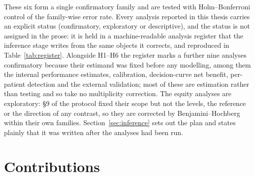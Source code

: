 These six form a single confirmatory family and are tested with
Holm--Bonferroni control of the family-wise error rate. Every analysis reported
in this thesis carries an explicit status (confirmatory, exploratory or
descriptive), and the status is not assigned in the prose: it is held in a
machine-readable analysis register that the inference stage writes from the
same objects it corrects, and reproduced in Table~\ref{tab:register}. Alongside
H1--H6 the register marks a further nine analyses confirmatory because their
estimand was fixed before any modelling, among them the internal performance
estimates, calibration, decision-curve net benefit, per-patient detection and
the external validation; most of these are estimation rather than testing and
so take no multiplicity correction. The equity analyses are exploratory: §9 of
the protocol fixed their scope but not the levels, the reference or the
direction of any contrast, so they are corrected by Benjamini--Hochberg within
their own families. Section~\ref{sec:inference} sets out the plan and states
plainly that it was written after the analyses had been run.


\section{Contributions}
\label{sec:contrib}

